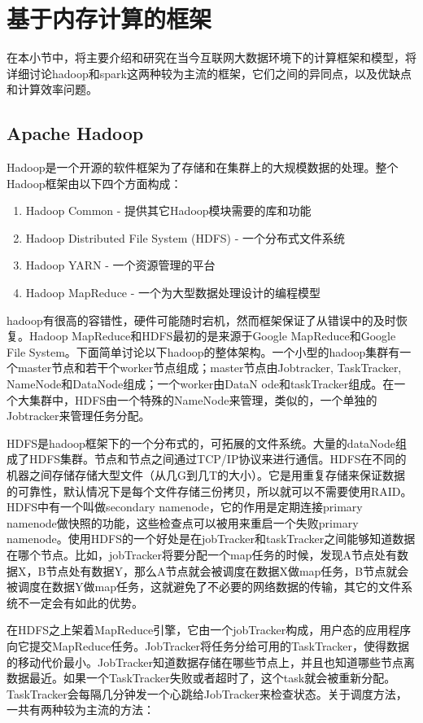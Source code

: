 \section{基于内存计算的框架}
\label{sec:framework}
在本小节中，将主要介绍和研究在当今互联网大数据环境下的计算框架和模型，将详细讨论hadoop和spark这两种较为主流的框架，它们之间的异同点，以及优缺点和计算效率问题。

\subsection{Apache Hadoop}
Hadoop是一个开源的软件框架为了存储和在集群上的大规模数据的处理。整个Hadoop框架由以下四个方面构成：

\begin{enumerate}
\item Hadoop Common - 提供其它Hadoop模块需要的库和功能
\item Hadoop Distributed File System (HDFS) - 一个分布式文件系统
\item Hadoop YARN - 一个资源管理的平台
\item Hadoop MapReduce - 一个为大型数据处理设计的编程模型
\end{enumerate}
hadoop有很高的容错性，硬件可能随时宕机，然而框架保证了从错误中的及时恢复。Hadoop MapReduce和HDFS最初的是来源于Google MapReduce和Google File System。下面简单讨论以下hadoop的整体架构。一个小型的hadoop集群有一个master节点和若干个worker节点组成；master节点由Jobtracker, TaskTracker, NameNode和DataNode组成；一个worker由DataN
ode和taskTracker组成。在一个大集群中，HDFS由一个特殊的NameNode来管理，类似的，一个单独的Jobtracker来管理任务分配。

HDFS是hadoop框架下的一个分布式的，可拓展的文件系统。大量的dataNode组成了HDFS集群。节点和节点之间通过TCP/IP协议来进行通信。HDFS在不同的机器之间存储存储大型文件（从几G到几T的大小）。它是用重复存储来保证数据的可靠性，默认情况下是每个文件存储三份拷贝，所以就可以不需要使用RAID。HDFS中有一个叫做secondary namenode，它的作用是定期连接primary namenode做快照的功能，这些检查点可以被用来重启一个失败primary namenode。使用HDFS的一个好处是在jobTracker和taskTracker之间能够知道数据在哪个节点。比如，jobTracker将要分配一个map任务的时候，发现A节点处有数据X，B节点处有数据Y，那么A节点就会被调度在数据X做map任务，B节点就会被调度在数据Y做map任务，这就避免了不必要的网络数据的传输，其它的文件系统不一定会有如此的优势。

在HDFS之上架着MapReduce引擎，它由一个jobTracker构成，用户态的应用程序向它提交MapReduce任务。JobTracker将任务分给可用的TaskTracker，使得数据的移动代价最小。JobTracker知道数据存储在哪些节点上，并且也知道哪些节点离数据最近。如果一个TaskTracker失败或者超时了，这个task就会被重新分配。TaskTracker会每隔几分钟发一个心跳给JobTracker来检查状态。关于调度方法，一共有两种较为主流的方法：

